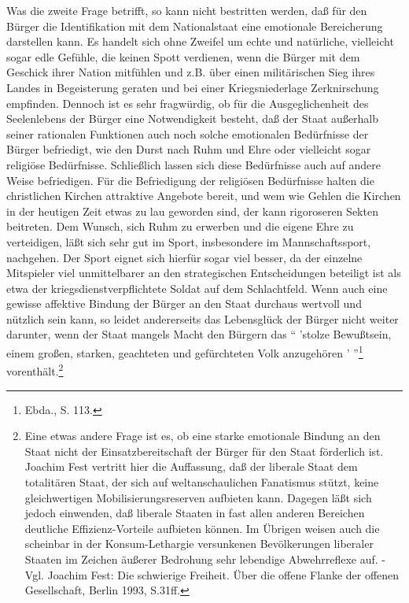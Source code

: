 \documentclass[12pt,a4paper]{article}
\begin{document}
Was die zweite Frage betrifft, so kann nicht bestritten werden, daß für den
Bürger die Identifikation mit dem Nationalstaat eine emotionale Bereicherung
darstellen kann. Es handelt sich ohne Zweifel um echte und natürliche,
vielleicht sogar edle Gefühle, die keinen Spott verdienen, wenn die Bürger mit
dem Geschick ihrer Nation mitfühlen und z.B. über einen militärischen Sieg
ihres Landes in Begeisterung geraten und bei einer Kriegsniederlage
Zerknirschung empfinden. Dennoch ist es sehr fragwürdig, ob für die
Ausgeglichenheit des Seelenlebens der Bürger eine Notwendigkeit besteht, daß
der Staat außerhalb seiner rationalen Funktionen auch noch solche emotionalen
Bedürfnisse der Bürger befriedigt, wie den Durst nach Ruhm und Ehre oder
vielleicht sogar religiöse Bedürfnisse. Schließlich lassen sich diese
Bedürfnisse auch auf andere Weise befriedigen. Für die Befriedigung der
religiösen Bedürfnisse halten die christlichen Kirchen attraktive Angebote
bereit, und wem wie Gehlen die Kirchen in der heutigen Zeit etwas zu lau
geworden sind, der kann rigoroseren Sekten beitreten. Dem Wunsch, sich Ruhm zu
erwerben und die eigene Ehre zu verteidigen, läßt sich sehr gut im Sport,
insbesondere im Mannschaftssport, nachgehen. Der Sport eignet sich hierfür
sogar viel besser, da der einzelne Mitspieler viel unmittelbarer an den
strategischen Entscheidungen beteiligt ist als etwa der
kriegsdienstverpflichtete Soldat auf dem Schlachtfeld. Wenn auch eine gewisse
affektive Bindung der Bürger an den Staat durchaus wertvoll und nützlich sein
kann, so leidet andererseits das Lebensglück der Bürger nicht weiter darunter,
wenn der Staat mangels Macht den Bürgern das "` 'stolze Bewußtsein, einem
großen, starken, geachteten und gefürchteten Volk anzugehören '
"'\footnote{Ebda., S. 113.} vorenthält.\footnote{Eine etwas andere Frage ist
  es, ob eine starke emotionale Bindung an den Staat nicht der
  Einsatzbereitschaft der Bürger für den Staat förderlich ist. Joachim Fest
  vertritt hier die Auffassung, daß der liberale Staat dem totalitären Staat,
  der sich auf weltanschaulichen Fanatismus stützt, keine gleichwertigen
  Mobilisierungsreserven aufbieten kann. Dagegen läßt sich jedoch einwenden,
  daß liberale Staaten in fast allen anderen Bereichen deutliche
  Effizienz-Vorteile aufbieten können. Im Übrigen weisen auch die scheinbar in
  der Konsum-Lethargie versunkenen Bevölkerungen liberaler Staaten im Zeichen
  äußerer Bedrohung sehr lebendige Abwehrreflexe auf. - Vgl. Joachim Fest: Die
  schwierige Freiheit. Über die offene Flanke der offenen Gesellschaft, Berlin
  1993, S.31ff.}
\end{document}
